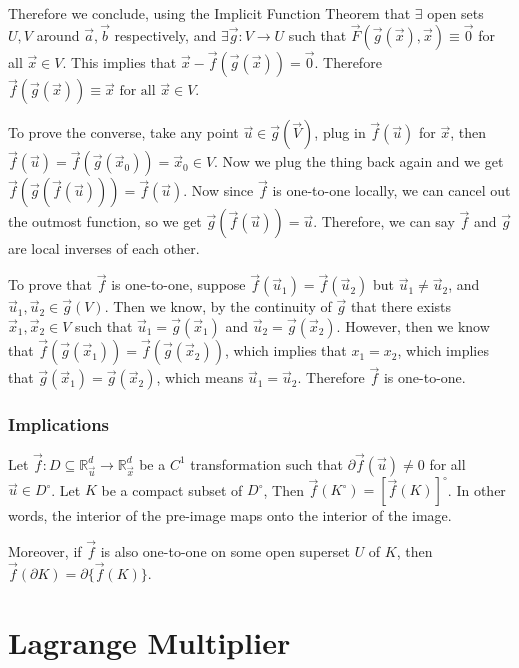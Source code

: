 \documentclass[11 pt, twoside]{article}
\begin{document}
Therefore we conclude, using the Implicit Function Theorem that $\exists$ open
sets $U, V$ around $\vec{a}, \vec{b}$ respectively, and $\exists \vec{g}:
V \to U$ such that $\vec{F}(\vec{g}(\vec{x}), \vec{x}) \equiv \vec{0}$ for all
$\vec{x} \in V$. This implies that $\vec{x} - \vec{f}(\vec{g}(\vec{x})) =
\vec{0}$. Therefore $\boxed{\vec{f}(\vec{g}(\vec{x})) \equiv \vec{x} \text{ for
all } \vec{x} \in V}$.

To prove the converse, take any point $\vec{u} \in \vec{g}(\vec{V})$, plug in
$\vec{f}(\vec{u})$ for $\vec{x}$, then $\vec{f}(\vec{u}) =
\vec{f}(\vec{g}(\vec{x}_0)) = \vec{x}_0 \in V$. Now we plug the thing back again
and we get $\vec{f}(\vec{g}(\vec{f}(\vec{u}))) = \vec{f}(\vec{u})$. Now since
$\vec{f}$ is one-to-one locally, we can cancel out the outmost function, so we
get $\vec{g}(\vec{f}(\vec{u})) = \vec{u}$. Therefore, we can say $\vec{f}$ and
$\vec{g}$ are local inverses of each other.

To prove that $\vec{f}$ is one-to-one, suppose $\vec{f}(\vec{u}_1) =
\vec{f}(\vec{u}_2)$ but $\vec{u}_1 \neq \vec{u}_2$, and $\vec{u}_1, \vec{u}_2
\in \vec{g}(V)$. Then we know, by the continuity of $\vec{g}$ that there exists
$\vec{x}_1, \vec{x}_2 \in V$ such that $\vec{u}_1 = \vec{g}(\vec{x}_1)$ and
$\vec{u}_2 = \vec{g}(\vec{x}_2)$. However, then we know that
$\vec{f}(\vec{g}(\vec{x}_1)) = \vec{f}(\vec{g}(\vec{x}_2))$, which implies that
$x_1 = x_2$, which implies that $\vec{g}(\vec{x}_1) = \vec{g}(\vec{x}_2)$, which
means $\vec{u}_1 = \vec{u}_2$. Therefore $\vec{f}$ is one-to-one.

\subsubsection{Implications}

Let $\vec{f}: D \subseteq \mathbb{R}^d_{\vec{u}} \to
\mathbb{R}^d_{\vec{x}}$ be a $C^1$ transformation such that $\partial
\vec{f}(\vec{u}) \neq 0$ for all $\vec{u} \in D^\circ$. Let $K$ be a compact
subset of $D^\circ$, Then $\vec{f}(K^\circ) = [\vec{f}(K)]^\circ$. In other
words, the interior of the pre-image maps onto the interior of the image.

Moreover, if $\vec{f}$ is also one-to-one on some open superset $U$ of $K$, then
$\vec{f}(\partial K) = \partial \{\vec{f}(K)\}$.


\section{Lagrange Multiplier}
\end{document}
